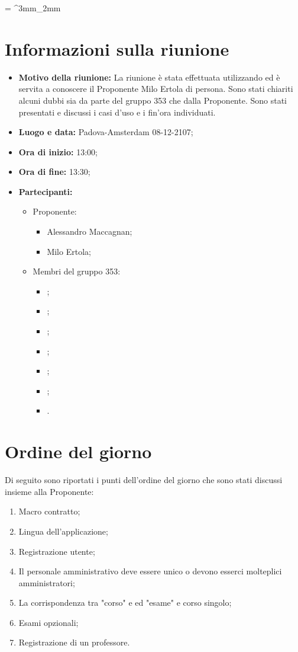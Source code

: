 \documentclass[VER-2017-12-08.tex]{subfiles}
\begin{document}
\tabulinesep = ^3mm_2mm
\chapter{Informazioni sulla riunione}
\begin{itemize}
	\item \textbf{Motivo della riunione:} La riunione è stata effettuata utilizzando  ed è servita a conoscere il Proponente Milo Ertola di persona. Sono stati chiariti alcuni dubbi sia da parte del gruppo 353 che dalla Proponente. Sono stati presentati e discussi i casi d'uso e i  fin'ora individuati.

	\item \textbf{Luogo e data:} Padova-Amsterdam 08-12-2107;
	\item \textbf{Ora di inizio:} 13:00;
	\item \textbf{Ora di fine:} 13:30;
	\item \textbf{Partecipanti:}
	\begin{itemize}
		\item Proponente:
		\begin{itemize}
			\item Alessandro Maccagnan;
			\item Milo Ertola;
		\end{itemize}
		\item Membri del gruppo 353:
		\begin{itemize}
			\item \Davide;
			\item \Elena;
			\item \Gianluca;
			\item \Mirco;
			\item \Parwinder;
			\item \Riccardo;
			\item \Valentina.
		\end{itemize}
	\end{itemize}
\end{itemize}
\chapter{Ordine del giorno}	
Di seguito sono riportati i punti dell'ordine del giorno che sono stati discussi insieme alla Proponente:
\begin{enumerate}
	\item Macro contratto; 
	\item Lingua dell'applicazione;
	\item Registrazione utente;
	\item Il personale amministrativo deve essere unico o devono esserci molteplici amministratori;
	\item La corrispondenza tra  "corso" e  ed "esame" e corso singolo;
	\item Esami opzionali;
	\item Registrazione di un professore.
\end{enumerate}
\end{document}
